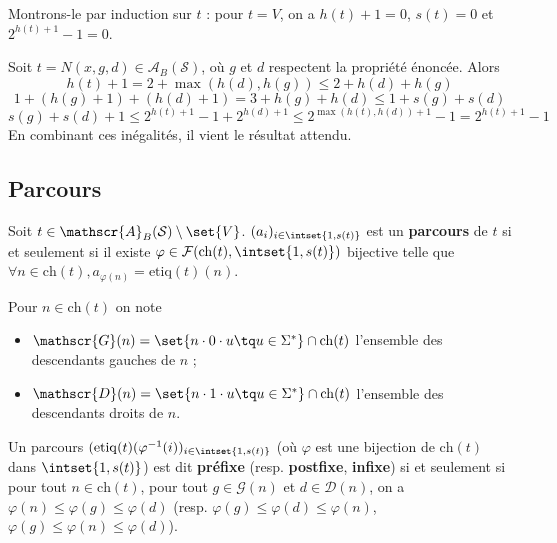 \documentclass{scrartcl}
\begin{document}
			\begin{demo}
				\item Montrons-le par induction sur $t$ : pour $t = V$, on a $h(t) + 1= 0$, $s(t) = 0$ et $2^{h(t)+1}-1 = 0$.
				\item Soit $t = N(x,g,d) \in \mathscr{A}_B(\mathcal{S})$, où $g$ et $d$ respectent la propriété énoncée.
					Alors 
					\[
						h(t) + 1 = 2 + \max(h(d), h(g)) \leq 2 + h(d) + h(g) 
					\]
					\[
						1 + (h(g)+1) + (h(d)+1) = 3 + h(g) + h(d) \leq 1 + s(g) + s(d)
					\]
					\[
						s(g) + s(d) + 1 \leq 2^{h(t) + 1} - 1 + 2^{h(d) + 1} \leq 2^{\max(h(t),h(d)) + 1} - 1 = 2^{h(t)+1}-1
					\]
					En combinant ces inégalités, il vient le résultat attendu.
			\end{demo}

		\subsection{Parcours}
			Soit $t \in \mathscr{A}_B(\mathcal{S})\setminus\set{V}$.
			$(a_i)_{i\in\intset{1,s(t)}}$ est un \textbf{parcours} de $t$ si et seulement si il existe $\varphi \in \mathcal{F}(\mathrm{ch}(t), \intset{1,s(t)})$ bijective telle que $\forall n \in \mathrm{ch}(t), a_{\varphi(n)} = \text{etiq}(t)(n)$.

			Pour $n \in \mathrm{ch}(t)$ on note 
			\begin{itemize}
				\item $\mathscr{G}(n) = \set{n\cdot 0 \cdot u \tq u \in \Sigma^*} \cap \mathrm{ch}(t)$ l'ensemble des descendants gauches de $n$ ;
				\item $\mathscr{D}(n) = \set{n\cdot 1 \cdot u \tq u \in \Sigma^*} \cap \mathrm{ch}(t)$ l'ensemble des descendants droits de $n$.
			\end{itemize}

			
			Un parcours $(\mathrm{etiq}(t)(\varphi^{-1}(i))_{i \in \intset{1,s(t)}}$ (où $\varphi$ est une bijection de $\mathrm{ch}(t)$ dans $\intset{1, s(t)}$)
			est dit \textbf{préfixe} (resp. \textbf{postfixe}, \textbf{infixe}) si et seulement si pour tout $n \in \mathrm{ch}(t)$, pour tout $g \in \mathscr{G}(n)$ et $d \in \mathscr{D}(n)$,
			on a $\varphi(n) \leq \varphi(g) \leq \varphi(d)$ (resp. $\varphi(g) \leq \varphi(d) \leq \varphi(n)$, $\varphi(g) \leq \varphi(n) \leq \varphi(d)$).
\end{document}
